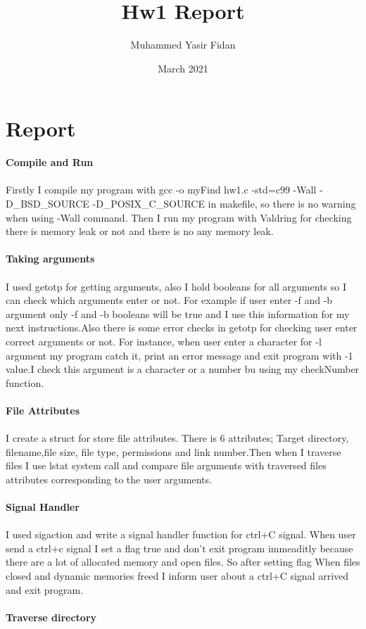\documentclass{article}
\title{Hw1 Report}
\author{Muhammed Yasir Fidan }
\date{March 2021}
\begin{document}
\maketitle

\section{Report}
\textbf{Compile and Run} \\
\\
Firstly I compile my program with gcc -o myFind hw1.c -std=c99 -Wall -D\_BSD\_SOURCE -D\_POSIX\_C\_SOURCE in makefile, so there is no warning when using -Wall command. Then I run my program with Valdring for checking there is memory leak or not and there is no any memory leak.\\
\\
\textbf{Taking arguments} \\
\\
I used getotp for getting arguments, also I hold booleans for all arguments so I can check which arguments enter or not. For example if user enter -f and -b argument only -f and -b booleans will be true and I use this information for my next instructions.Also there is some error checks in getotp for checking user enter correct arguments or not. For instance, when user enter a character for -l argument my program catch it, print an error message and exit program with -1 value.I check this argument is a character or a number bu using my checkNumber function.\\
\\
\textbf{File Attributes} \\
\\
I create a struct for store file attributes. There is 6 attributes; Target directory, filename,file size, file type, permissions and link number.Then when I traverse files I use lstat system call and compare file arguments with traversed files attributes corresponding to the user arguments.\\
\\
\textbf{Signal Handler} \\
\\
I used sigaction and write a signal handler function for ctrl+C signal. When user send a ctrl+c signal I set a flag true and don't exit program immeaditly because there are a lot of allocated memory and open files. So after setting flag When files closed and dynamic memories freed I inform user about a ctrl+C signal arrived and exit program.\\
\\
\textbf{Traverse directory} \\
\\
\end{document}
